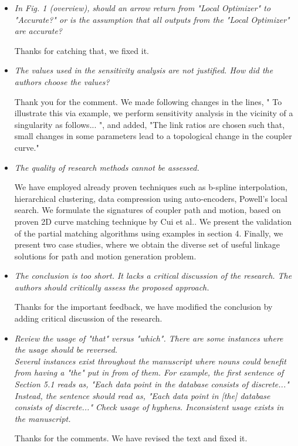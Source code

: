 \documentclass{article}
\begin{document}
\begin{itemize}
  \item \emph{
  In Fig. 1 (overview), should an arrow return from "Local Optimizer" to "Accurate?" or is the assumption that all outputs from the "Local Optimizer" are accurate?
}

Thanks for catching that, we fixed it.
\\

  \item \emph{
The values used in the sensitivity analysis are not justified. How did the authors choose the values?
}

Thank you for the comment. We made following changes in the lines,
"
To illustrate this via example, we perform sensitivity analysis in the vicinity of a singularity as follows... ",
and added, "The link ratios are chosen such that, small changes in some parameters lead to a topological change in the coupler curve."
\\

  \item \emph{
The quality of research methods cannot be assessed.
}

We have employed already proven techniques such as b-spline interpolation, hierarchical clustering, data compression using auto-encoders, Powell's local search.
We formulate the signatures of coupler path and motion, based on proven 2D curve matching technique by Cui et al.\cite{cui2009}.
We present the validation of the partial matching algorithms using examples in section 4.
Finally, we present two case studies, where we obtain the diverse set of useful linkage solutions for path and motion generation problem.
\\

  \item \emph{
The conclusion is too short. It lacks a critical discussion of the research. The authors should critically assess the proposed approach.
}

Thanks for the important feedback, we have modified the conclusion by adding critical discussion of the research.

  \item \emph{
 Review the usage of "that" versus "which". There are some instances where the usage should be reversed.
 \\
 Several instances exist throughout the manuscript where nouns could benefit from having a "the" put in from of them. For example, the first sentence of Section 5.1 reads as, "Each data point in the database consists of discrete..." Instead, the sentence should read as, "Each data point in [the] database consists of discrete..."
 Check usage of hyphens. Inconsistent usage exists in the manuscript.
 }

 Thanks for the comments. We have revised the text and fixed it.
\\

\end{itemize}
\end{document}
